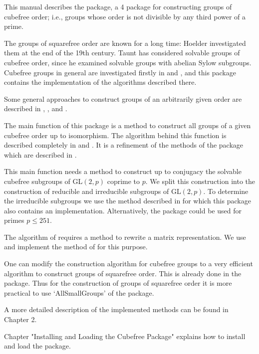 



This manual describes the {\Cubefree}  package,
a {\GAP} 4 package for constructing groups of cubefree order; i.e., groups
whose order is not divisible by any third power of a prime.

The groups of squarefree order are known for a long time: Hoelder
\cite{Hol93} investigated them at the end of the 19th century. Taunt
\cite{Tau55} has considered solvable groups of cubefree order, since he
examined solvable groups with abelian Sylow subgroups. Cubefree groups in
general are investigated firstly in \cite{Di05} and \cite{DiEi05}, and this
package contains the implementation of the algorithms described
there.

Some general approaches to construct groups of an arbitrarily given order are
described in \cite{BeEia}, \cite{BeEib}, and \cite{BeEiO}.

The main function of this package is a method to construct 
all groups of a given cubefree order up to isomorphism. The algorithm behind this function is
described completely in \cite{Di05} and \cite{DiEi05}. It is a refinement of
the methods of the {\GrpConst} package which are described in \cite{GrpConst}.

This main function needs a method to construct up to conjugacy the solvable
cubefree subgroups of GL$(2,p)$ coprime to $p$. We split this construction
into the construction of reducible and irreducible subgroups of GL$(2,p)$. To determine the
irreducible subgroups we use the method described in \cite{FlOB05} for which this package
also contains an implementation. Alternatively, the {\Irredsol} package
\cite{Irredsol} could be used for primes $p\le 251$.

The algorithm of \cite{FlOB05} requires a method to rewrite a matrix
representation. We use and implement the method of \cite{GlHo97} for this purpose.

One can modify the construction algorithm for cubefree groups to a very
efficient algorithm to construct groups of squarefree order. This is already
done in the  {\GrpConst} package. Thus for the construction of groups of squarefree order it is more practical to
use `AllSmallGroups' of the {\GrpConst} package. 

A more detailed description of the implemented methods can be found in Chapter 2.

Chapter "Installing and Loading the Cubefree Package" explains
how to install and load the {\Cubefree} package.
